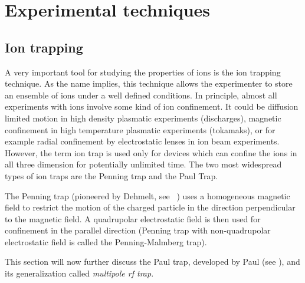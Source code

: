 
\chapter{Experimental techniques}

\label{ch:Experimental}
\section{Ion trapping}
A very important tool for studying the properties of ions is the ion
trapping technique. As the name implies, this technique allows
the experimenter to store an ensemble of ions under a well defined
conditions. In principle, almost all experiments with ions involve
some kind of ion confinement. It could be diffusion limited motion
in high density plasmatic experiments (discharges), magnetic 
confinement in high temperature plasmatic experiments (tokamaks),
or for example radial confinement by electrostatic lenses in
ion beam experiments. However, the term ion trap is used only for
devices which can confine the ions in all three dimension for
potentially unlimited time. The two most widespread types of ion
traps are the Penning trap and the Paul Trap.

The Penning trap
(pioneered by Dehmelt, see \eg\, \cite{dehmelt1968})
uses a homogeneous magnetic field to restrict the motion of the
charged particle in the direction perpendicular to the magnetic field.
A quadrupolar electrostatic field is then used for confinement
in the parallel direction (Penning trap with non-quadrupolar
electrostatic field is called the Penning-Malmberg trap).

This section will now further discuss the Paul trap, developed
by Paul (see \cite{paul1990}), and its generalization called
{\em multipole rf trap}.

